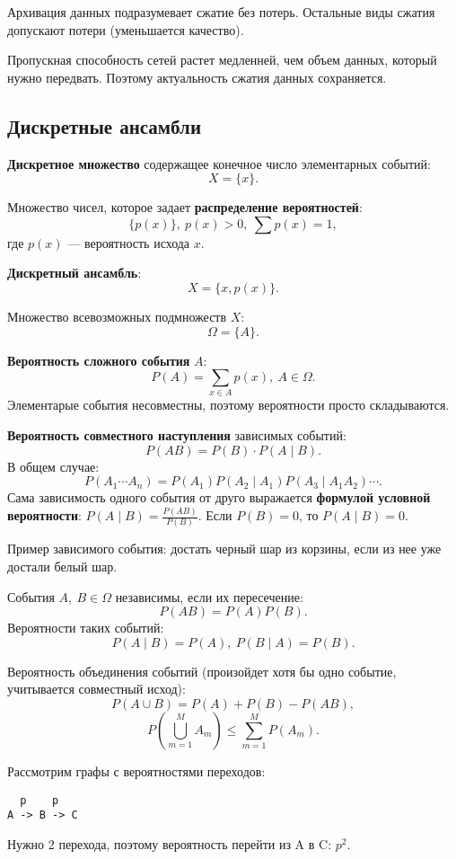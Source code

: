 Архивация данных подразумевает сжатие без потерь. Остальные виды сжатия
допускают потери (уменьшается качество).

Пропускная способность сетей растет медленней, чем объем данных, который
нужно передвать. Поэтому актуальность сжатия данных сохраняется.

\subsection{Дискретные ансамбли}

\textbf{Дискретное множество} содержащее конечное число элементарных событий:
\[
    X = \{ x \}.
\]

Множество чисел, которое задает \textbf{распределение вероятностей}:
\[
    \{ p(x) \},\ p(x) > 0,\ \sum p(x) = 1,
\]
где $p(x)$ --- вероятность исхода $x$.

\textbf{Дискретный ансамбль}:
\[
    X = \{x, p(x)\}.
\]

Множество всевозможных подмножеств $X$:
\[
    \Omega = \{A\}.
\]

\textbf{Вероятность сложного события} $A$:
\[
    P(A) = \sum_{x \in A} p(x),\ A \in \Omega.
\]
Элементарые события несовместны, поэтому вероятности просто складываются.

\textbf{Вероятность совместного наступления} зависимых событий:
\[
    P(AB) = P(B) \cdot P(A \mid B).
\]
В общем случае:
\[
    P(A_1 \cdots A_n) = P(A_1) P(A_2 \mid A_1) P(A_3 \mid A_1 A_2) \cdots .
\]
Сама зависимость одного события от друго выражается \textbf{формулой условной
вероятности}: $P(A \mid B) = \frac{P(AB)}{P(B)}$. Если $P(B) = 0$, то $P(A \mid
B) = 0$.

Пример зависимого события: достать черный шар из корзины, если из нее уже
достали белый шар.

События $A,\ B \in \Omega$ независимы, если их пересечение:
\[
    P(AB) = P(A)P(B).
\]
Вероятности таких событий:
\[
    P(A \mid B) = P(A),\ P(B \mid A) = P(B).
\]

Вероятность объединения событий (произойдет хотя бы одно событие, учитывается
совместный исход):
\[
    P(A \cup B) = P(A) + P(B) - P(AB),
\]
\[
    P(\bigcup^M_{m=1} A_m) \leq \sum^M_{m=1} P(A_m).
\]

Рассмотрим графы с вероятностями переходов:

\begin{verbatim}
  p    p
A -> B -> C
\end{verbatim}

Нужно 2 перехода, поэтому вероятность перейти из A в C: $p^2$.

